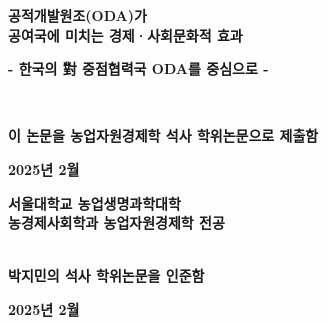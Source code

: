 \begin{titlepage}
    \begin{center}

        {\fontsize{22pt}{\baselineskip}\selectfont \textbf{공적개발원조(ODA)가}}\\
        \vspace{.6cm}
        {\fontsize{22pt}{\baselineskip}\selectfont \textbf{공여국에 미치는 경제·사회문화적 효과}}\\
        \vspace{.6cm}

        {\fontsize{16pt}{\baselineskip}\selectfont \textbf{- 한국의 {\hanjafont 對} 중점협력국 ODA를 중심으로 -}}\\
        \vspace{1.5cm}

            \\
        \vspace{1.5cm}

        {\fontsize{16pt}{\baselineskip}\selectfont \textbf{이 논문을 농업자원경제학 석사 학위논문으로 제출함}}\\
        \vspace{0.2cm}

        {\fontsize{14pt}{\baselineskip}\selectfont \textbf{2025년 2월}}\\
        \vspace{1cm}

        {\fontsize{16pt}{\baselineskip}\selectfont \textbf{서울대학교 농업생명과학대학}}\\
        \vspace{.2cm}
        {\fontsize{14pt}{\baselineskip}\selectfont \textbf{농경제사회학과 농업자원경제학 전공}}\\
        \vspace{.2cm}
        \\
        \vspace{1cm}

        {\fontsize{16pt}{\baselineskip}\selectfont \textbf{박지민의 석사 학위논문을 인준함}}\\
        \vspace{0.2cm}

        {\fontsize{14pt}{\baselineskip}\selectfont \textbf{2025년 2월}}\\
        \vspace{2.5cm}
        

\end{center}
\end{titlepage}

